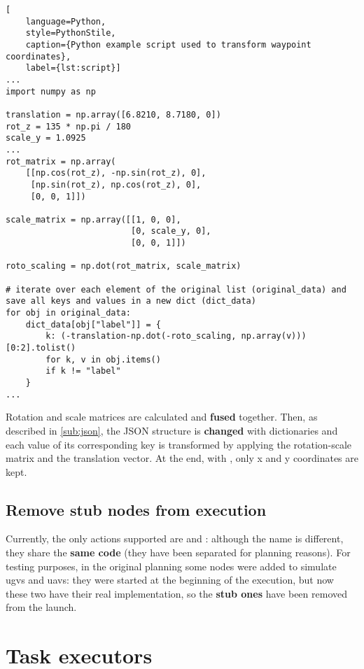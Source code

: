 \applymulticoltrue

\noindent\begin{lstlisting}[
    language=Python,
    style=PythonStile,
    caption={Python example script used to transform waypoint coordinates},
    label={lst:script}]
...
import numpy as np

translation = np.array([6.8210, 8.7180, 0])
rot_z = 135 * np.pi / 180
scale_y = 1.0925
...
rot_matrix = np.array(
    [[np.cos(rot_z), -np.sin(rot_z), 0],
     [np.sin(rot_z), np.cos(rot_z), 0],
     [0, 0, 1]])

scale_matrix = np.array([[1, 0, 0], 
                         [0, scale_y, 0],
                         [0, 0, 1]])

roto_scaling = np.dot(rot_matrix, scale_matrix)

# iterate over each element of the original list (original_data) and save all keys and values in a new dict (dict_data)
for obj in original_data:
    dict_data[obj["label"]] = {
        k: (-translation-np.dot(-roto_scaling, np.array(v)))[0:2].tolist()
        for k, v in obj.items()
        if k != "label"
    }
...
\end{lstlisting}

\applymulticolfalse

Rotation and scale matrices are calculated and \textbf{fused} together. Then, as described in \autoref{sub:json}, the JSON structure is \textbf{changed} with dictionaries and each value of its corresponding key is transformed by applying the rotation-scale matrix and the translation vector. At the end, with \code{[0:2]}, only x and y coordinates are kept.

\subsection{Remove stub nodes from execution}

Currently, the only actions supported are  and : although the name is different, they share the \textbf{same code} (they have been separated for planning reasons). For testing purposes, in the original planning some nodes were added to simulate \acrshort{ugvs} and \acrshort{uavs}: they were started at the beginning of the execution, but now these two have their real implementation, so the \textbf{stub ones} have been removed from the launch.

\section{Task executors}

